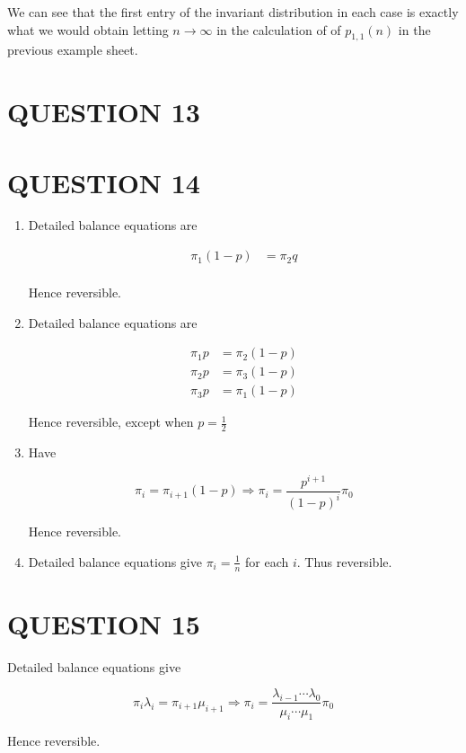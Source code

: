 \documentclass[a4paper]{article}
\begin{document}
We can see that the first entry of the invariant distribution in each case is exactly what we would obtain letting $ n \to \infty $ in the calculation of of $ p_{1,1}(n) $ in the previous example sheet.






\section{QUESTION 13}
\section{QUESTION 14}

\begin{enumerate}[label = (\alph*)]
	\item Detailed balance equations are
	
	\begin{align*}
	\pi_{1}(1-p)  & = \pi_{2} q \\
	\end{align*}
	
	Hence reversible.
	

	
	\item Detailed balance equations are
	
	\begin{align*}
	\pi_{1} p & = \pi_{2}(1-p)  \\
	\pi_{2} p & = \pi_{3}(1-p) \\
	\pi_{3} p & = \pi_{1}(1-p) 
	\end{align*}
	
	Hence reversible, except when $ p = \frac{1}{2} $
	
	\item Have
	
	\[ \pi_{i} = \pi_{i+1}(1-p) \Rightarrow \pi_{i} = \frac{p^{i+1}}{(1-p)^{i}}\pi_{0} \]
	
	Hence reversible.
	
	\item Detailed balance equations give $ \pi_{i} = \frac{1}{n} $ for each $ i $. Thus reversible. 
	
	
	
	
\end{enumerate}


\section{QUESTION 15}

	Detailed balance equations give
	
	\[ \pi_{i}\lambda_{i} = \pi_{i+1}\mu_{i+1} \Rightarrow \pi_{i} = \frac{\lambda_{i-1}\cdots\lambda_{0}}{\mu_{i}\cdots\mu_{1}} \pi_{0} \]
	
	Hence reversible.
\end{document}
